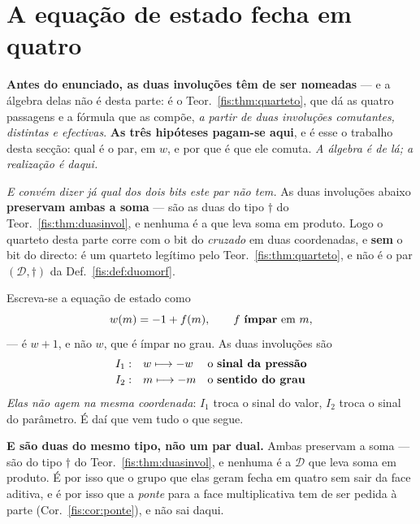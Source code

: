 \documentclass[livro.tex]{subfiles}
\begin{document}

\section{A equação de estado fecha em quatro}\label{fis:bidual}

\noindent\textbf{Antes do enunciado, as duas involuções têm de ser nomeadas} ---
e a álgebra delas não é desta parte: é o Teor.~\ref{fis:thm:quarteto}, que dá as
quatro passagens e a fórmula que as compõe, \emph{a partir de duas involuções
comutantes, distintas e efectivas}. \textbf{As três hipóteses pagam-se aqui}, e é
esse o trabalho desta secção: qual é o par, em $w$, e por que é que ele comuta.
\emph{A álgebra é de lá; a realização é daqui.}

\medskip\noindent\emph{E convém dizer já qual dos dois bits este par não tem.} As
duas involuções abaixo \textbf{preservam ambas a soma} --- são as duas do tipo
$\dagger$ do Teor.~\ref{fis:thm:duasinvol}, e nenhuma é a que leva soma em
produto. Logo o quarteto desta parte corre com o bit do \emph{cruzado} em duas
coordenadas, e \textbf{sem} o bit do directo: é um quarteto legítimo pelo
Teor.~\ref{fis:thm:quarteto}, e não é o par $(\mathcal{D},\dagger)$ da
Def.~\ref{fis:def:duomorf}.

\begin{definicao}\label{fis:def:duas-inv}
Escreva-se a equação de estado como
\[
w(m)=-1+f(m),\qquad f\ \text{\textbf{ímpar} em } m ,
\]
--- é $w+1$, e não $w$, que é ímpar no grau. As duas involuções são
\[
\begin{array}{lll}
I_1: & w\longmapsto -w & \text{o \textbf{sinal da pressão}}\\[2pt]
I_2: & m\longmapsto -m & \text{o \textbf{sentido do grau}}
\end{array}
\]
\emph{Elas não agem na mesma coordenada}: $I_1$ troca o sinal do valor, $I_2$
troca o sinal do parâmetro. É daí que vem tudo o que segue.

\medskip\noindent\textbf{E são duas do mesmo tipo, não um par dual.} Ambas
preservam a soma --- são do tipo $\dagger$ do Teor.~\ref{fis:thm:duasinvol}, e
nenhuma é a $\mathcal{D}$ que leva soma em produto. É por isso que o grupo que
elas geram fecha em quatro sem sair da face aditiva, e é por isso que a
\emph{ponte} para a face multiplicativa tem de ser pedida à parte
(Cor.~\ref{fis:cor:ponte}), e não sai daqui.
\end{definicao}
\end{document}
